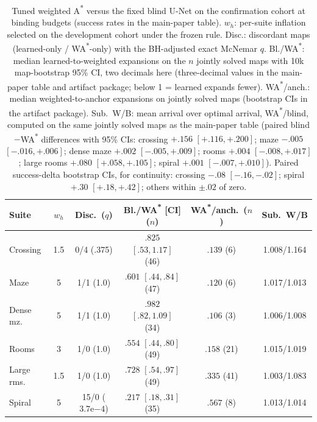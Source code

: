 \documentclass[letterpaper]{article} %
\begin{document}
\begin{table}[t]
\centering
\small
\setlength{\tabcolsep}{1.3pt}
\begin{tabular}{@{}lccccc@{}}
\toprule
Suite & $w_h$ & Disc.\ ($q$) & Bl./WA\textsuperscript{*} [CI] ($n$) & WA\textsuperscript{*}/anch.\ ($n$) & Sub.\ W/B \\
\midrule
Crossing & 1.5 & 0/4 (.375) & $.825$ $[.53,1.17]$ (46) & $.139$ (6) & 1.008/1.164 \\
Maze & 5 & 1/1 (1.0) & $.601$ $[.44,.84]$ (47) & $.120$ (6) & 1.017/1.013 \\
Dense mz. & 5 & 1/1 (1.0) & $.982$ $[.82,1.09]$ (34) & $.106$ (3) & 1.006/1.008 \\
Rooms & 3 & 1/0 (1.0) & $.554$ $[.44,.80]$ (49) & $.158$ (21) & 1.015/1.019 \\
Large rms. & 1.5 & 1/0 (1.0) & $.728$ $[.54,.97]$ (49) & $.335$ (41) & 1.003/1.083 \\
Spiral & 5 & 15/0 ($3.7\mathrm{e}{-4}$) & $.217$ $[.18,.31]$ (35) & $.567$ (8) & 1.013/1.014 \\
\bottomrule
\end{tabular}
\caption{Tuned weighted A\textsuperscript{*} versus the fixed blind U-Net on the confirmation cohort at binding budgets (success rates in the main-paper table). $w_h$: per-suite inflation selected on the development cohort under the frozen rule. Disc.: discordant maps (learned-only / WA\textsuperscript{*}-only) with the BH-adjusted exact McNemar $q$. Bl./WA\textsuperscript{*}: median learned-to-weighted expansions on the $n$ jointly solved maps with 10k map-bootstrap 95\% CI, two decimals here (three-decimal values in the main-paper table and artifact package; below 1 = learned expands fewer). WA\textsuperscript{*}/anch.: median weighted-to-anchor expansions on jointly solved maps (bootstrap CIs in the artifact package). Sub.\ W/B: mean arrival over optimal arrival, WA\textsuperscript{*}/blind, computed on the same jointly solved maps as the main-paper table (paired blind$-$WA\textsuperscript{*} differences with 95\% CIs: crossing $+.156$ $[+.116,+.200]$; maze $-.005$ $[-.016,+.006]$; dense maze $+.002$ $[-.005,+.009]$; rooms $+.004$ $[-.008,+.017]$; large rooms $+.080$ $[+.058,+.105]$; spiral $+.001$ $[-.007,+.010]$). Paired success-delta bootstrap CIs, for continuity: crossing $-.08$ $[-.16,-.02]$; spiral $+.30$ $[+.18,+.42]$; others within $\pm.02$ of zero.}
\label{tab:wastar}
\end{table}
\end{document}
